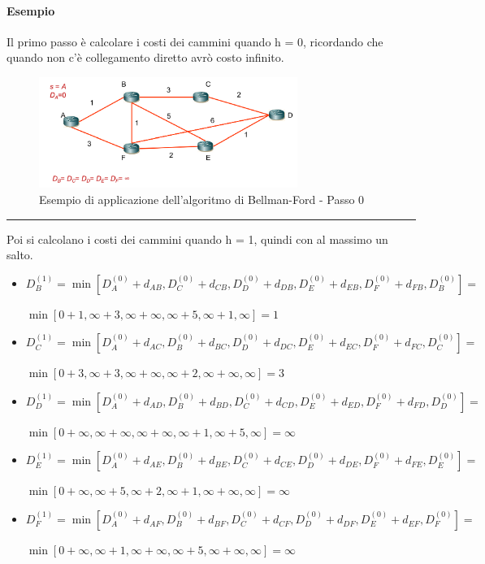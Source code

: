 \paragraph{Esempio}

Il primo passo è calcolare i costi dei cammini quando h = 0, ricordando che quando non c'è collegamento diretto avrò costo infinito.

\begin{figure}[h!]
    \centering
    \includegraphics[width=0.75\textwidth]{images/bf1.png}
    \caption{Esempio di applicazione dell'algoritmo di Bellman-Ford - Passo 0}
    \label{fig:bf1}
\end{figure}

\vspace{1em}
\noindent\rule{\linewidth}{0.4pt}
\vspace{1em}

Poi si calcolano i costi dei cammini quando h = 1, quindi con al massimo un salto.

\begin{itemize}
    \item $D_B^{(1)} = \min [D_A^{(0)} + d_{AB}, D_C^{(0)} + d_{CB}, D_D^{(0)} + d_{DB}, D_E^{(0)} + d_{EB}, D_F^{(0)} + d_{FB}, D_B^{(0)}] = $
   
    $\min [0 + 1, \infty + 3, \infty + \infty, \infty + 5, \infty + 1, \infty] = 1$
    \item $D_C^{(1)} = \min [D_A^{(0)} + d_{AC}, D_B^{(0)} + d_{BC}, D_D^{(0)} + d_{DC}, D_E^{(0)} + d_{EC}, D_F^{(0)} + d_{FC}, D_C^{(0)}] = $
    
    $\min [0 + 3, \infty + 3, \infty + \infty, \infty + 2, \infty + \infty, \infty] = 3$
    \item $D_D^{(1)} = \min [D_A^{(0)} + d_{AD}, D_B^{(0)} + d_{BD}, D_C^{(0)} + d_{CD}, D_E^{(0)} + d_{ED}, D_F^{(0)} + d_{FD}, D_D^{(0)}] = $ 
    
    $\min [0 + \infty, \infty + \infty, \infty + \infty, \infty + 1, \infty + 5, \infty] = \infty$
    \item $D_E^{(1)} = \min [D_A^{(0)} + d_{AE}, D_B^{(0)} + d_{BE}, D_C^{(0)} + d_{CE}, D_D^{(0)} + d_{DE}, D_F^{(0)} + d_{FE}, D_E^{(0)}] = $ 
    
    $\min [0 + \infty, \infty + 5, \infty + 2, \infty + 1, \infty + \infty, \infty] = \infty$
    
    \item $D_F^{(1)} = \min [D_A^{(0)} + d_{AF}, D_B^{(0)} + d_{BF}, D_C^{(0)} + d_{CF}, D_D^{(0)} + d_{DF}, D_E^{(0)} + d_{EF}, D_F^{(0)}] = $ 
    
    $\min [0 + \infty, \infty + 1, \infty + \infty, \infty + 5, \infty + \infty, \infty] = \infty$
\end{itemize}


